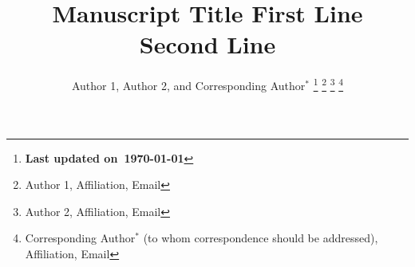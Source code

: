 \documentclass[journal,onecolumn]{IEEEtran}
\begin{document}
\title{\huge Manuscript Title First Line\\Second Line}
\author{
  Author 1, Author 2, and
  Corresponding Author$^{\ast}$%
  \thanks{\bf Last updated on~\today{}}
  \thanks{Author 1, 
    Affiliation, Email}
  \thanks{Author 2, 
    Affiliation, Email}
  \thanks{Corresponding Author$^{\ast}$
    (to whom correspondence should be addressed),
    Affiliation, Email}
}

\maketitle

\begin{abstract}
	
\end{abstract}

\IEEEpeerreviewmaketitle





\end{document}
